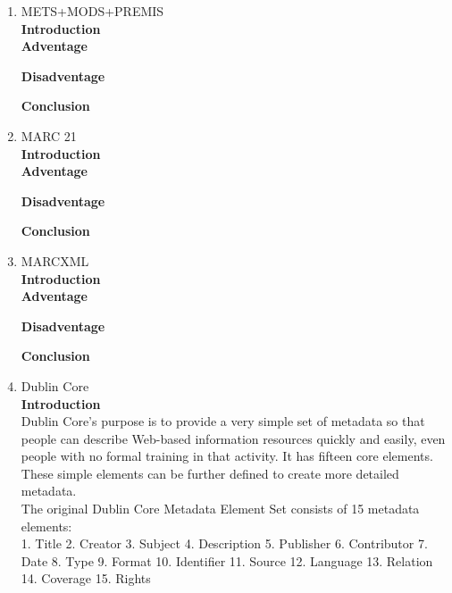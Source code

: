 \documentclass[a4paper]{article} %
\begin{document}
\begin{enumerate}
		\item METS+MODS+PREMIS\\
		{\bf Introduction}\\
		
		{\bf Adventage}
		\begin{enumerate}
			
		\end{enumerate}	
		{\bf Disadventage}
		\begin{enumerate}
			
		\end{enumerate}
		{\bf Conclusion}\\
		
		\item MARC 21\\
		{\bf Introduction}\\
		
		{\bf Adventage}
		\begin{enumerate}
			
		\end{enumerate}	
		{\bf Disadventage}
		\begin{enumerate}
			
		\end{enumerate}
		{\bf Conclusion}\\
		
		\item MARCXML\\
		{\bf Introduction}\\
		
		{\bf Adventage}
		\begin{enumerate}
			
		\end{enumerate}	
		{\bf Disadventage}
		\begin{enumerate}
			
		\end{enumerate}
		{\bf Conclusion}\\
		
		\item Dublin Core\\
		{\bf Introduction}\\ 
        Dublin Core's purpose is to provide a very simple set of metadata so   that people can describe Web-based information resources quickly and easily, even people with no formal training in that activity. It has fifteen core elements. These simple elements can be further defined to create more detailed metadata.\\
		The original Dublin Core Metadata Element Set consists of 15 metadata elements:\\
		1. Title 2. Creator 3. Subject 4. Description 5. Publisher 
		6. Contributor 7. Date 8. Type 9. Format 10. Identifier
		11. Source 12. Language 13. Relation 14. Coverage 15. Rights
		

\end{enumerate}
\end{document}
